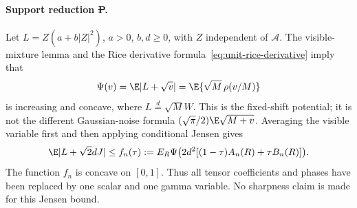 \paragraph{Support reduction \st{P}.}
Let $L=Z(a+b|Z|^2)$, $a>0$, $b,d\ge0$, with $Z$ independent of
$\mathcal A$. The visible-mixture lemma and the Rice derivative
formula~\eqref{eq:unit-rice-derivative} imply that
\[
 \Psi(v)=\E|L+\sqrt v|=\E\{\sqrt M\,\rho(v/M)\}
\]
is increasing and concave, where $L\overset d=\sqrt M W$.
This is the fixed-shift potential; it is not the different
Gaussian-noise formula $(\sqrt\pi/2)\E\sqrt{M+v}$.
Averaging the visible variable first and then applying conditional
Jensen gives
\begin{equation}\label{eq:spherical-core-support}
 \E|L+\sqrt2dJ|
 \le f_n(\tau):=E_R\Psi\bigl(2d^2[(1-\tau)A_n(R)+\tau B_n(R)]\bigr).
\end{equation}
The function $f_n$ is concave on $[0,1]$. Thus all tensor
coefficients and phases have been replaced by one scalar and one
gamma variable. No sharpness claim is made for this Jensen bound.

